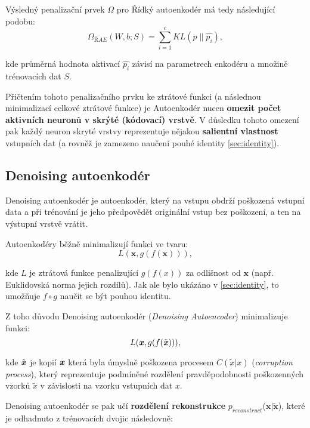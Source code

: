 Výsledný penalizační prvek $\Omega$ pro Řídký autoenkodér má tedy následující podobu:
\begin{equation}
    \Omega_{ŘAE}(W, b; S) = \sum_{i=1}^{c}KL(p \parallel \hat{p_i}),
\end{equation}

kde průměrná hodnota aktivací $\hat{p_i}$ závisí na parametrech enkodéru a množině trénovacích dat $S$. 

Přičtením tohoto penalizačního prvku ke ztrátové funkci (a následnou minimalizací celkové ztrátové funkce) je Autoenkodér nucen \textbf{omezit počet aktivních neuronů v skrýté (kódovací) vrstvě}.
V důsledku tohoto omezení pak každý neuron skryté vrstvy reprezentuje nějakou \textbf{salientní vlastnost} vstupních dat (a rovněž je zamezeno naučení pouhé identity \autoref{sec:identity}).

\subsection{Denoising autoenkodér}
\label{sec:denoising_autoencoder}
Denoising autoenkodér je autoenkodér, který na vstupu obdrží poškozená vstupní data
a při trénování je jeho předpovědět originální vstup bez poškození, a ten na výstupní vrstvě vrátit.

Autoenkodéry běžně minimalizují funkci ve tvaru:
\begin{equation}
    L(\mathbf{x}, g(f(\mathbf{x}))),
\end{equation}

kde $L$ je ztrátová funkce penalizující $g(f(x))$ za odlišnost od $\mathbf{x}$ (např. Euklidovská norma jejich rozdílů).
Jak ale bylo ukázáno v \autoref{sec:identity}, to umožňuje $f \circ g$ naučit se být pouhou identitu.


Z toho důvodu Denoising autoenkodér (\emph{Denoising Autoencoder}) minimalizuje funkci:
\begin{equation}
    L(\textbf{\emph{x}}, g(f(\tilde{\textbf{\emph{x}}}))),
\end{equation}

kde $\tilde{\textbf{\emph{x}}}$ je kopií $\textbf{\emph{x}}$ která byla úmyslně poškozena procesem $C(\tilde{x} | x)$ (\emph{corruption process}),
který reprezentuje podmíněné rozdělení pravděpodobnosti poškozenných vzorků $\tilde{x}$ v závislosti na vzorku vstupních dat $x$.

Denoising autoenkodér se pak učí \textbf{rozdělení rekonstrukce} $p_{reconstruct}$($\mathbf{x}|\mathbf{\tilde{x}}$),
které je odhadnuto z trénovacích dvojic následovně:

